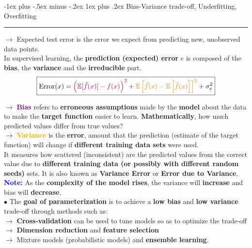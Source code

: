 \documentclass[letterpaper, 10.5pt,landscape]{article}
\makeatletter
\def\mathcolor#1#{\@mathcolor{#1}}
\def\@mathcolor#1#2#3{%
  \protect\leavevmode
  \begingroup
    \color#1{#2}#3%
  \endgroup
}
\renewcommand{\subsubsection}{\@startsection{subsubsection}{3}{0mm}%
                                {-1ex plus -.5ex minus -.2ex}%
                                {1ex plus .2ex}%
                                {\normalfont\small\bfseries}}
\makeatother
\begin{document}
\begin{multicols*}{3}
\subsubsection{Bias-Variance trade-off, Underfitting, Overfitting} {\color{teal}\hrule height 0.5pt} \smallskip

$\rightarrow$ Expected test error is the error we expect from predicting new, unobserved data points. \\
In supervised learning, the \textbf{prediction (expected) error} $e$ is composed of the \textbf{bias}, the \textbf{variance} and the \textbf{irreducible} part.  
\vspace{-3pt}
\[\boxed{\text{Error}(x) =  \mathcolor{purple}{\left(\mathbb{E}[\hat{f}(x)] - f(x)\right)^{2}} + \mathcolor{orange}{\mathbb{E} \left[\hat{f}(x)- \mathbb{E}\left[\hat{f}(x)\right] \right]^{2}} + \sigma^{2}_{e}}\]
\vspace{-5pt}

$\rightarrow$ \textbf{\textcolor{purple}{Bias}} refers to \textbf{erroneous assumptions} made by the \textbf{model} about the data to make the \textbf{target function} easier to learn. \textbf{Mathematically}, how much predicted values differ from true values?
\\
$\rightarrow$ \textbf{\textcolor{orange}{Variance}} is the \textbf{error}, amount that the prediction (estimate of the target function) will change if \textbf{different training data sets} were used. \\

It measures how scattered (inconsistent) are the predicted values from the correct value due to \textbf{different training data (or possibly with different random seeds)} sets. It is also known as \textbf{Variance Error} or \textbf{Error due to Variance}. \\

\textbf{\textcolor{blue}{Note:}} As the \textbf{complexity of the model rises}, the variance will \textbf{increase} and bias will \textbf{decrease}.  \\

$\bullet$ The \textbf{goal of parameterization} is to achieve a \textbf{low bias} and \textbf{low variance} trade-off through methods such as:\\
$\rightarrow$ \textbf{Cross-validation} can be used to tune models so as to optimize the trade-off \\
$\rightarrow$ \textbf{Dimension reduction} and \textbf{feature selection} \\
$\rightarrow$ Mixture models (probabilistic models) and \textbf{ensemble learning}. \\


\end{multicols*}
\end{document}
